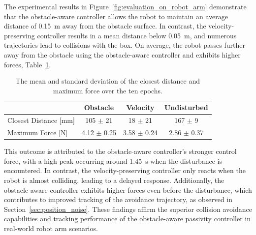 The experimental results in Figure~\ref{fig:evaluation_on_robot_arm} demonstrate that the obstacle-aware controller allows the robot to maintain an average distance of \qty{0.15}{m} away from the obstacle surface. In contrast, the velocity-preserving controller results in a mean distance below \qty{0.05}{m}, and numerous trajectories lead to collisions with the box. On average, the robot passes further away from the obstacle using the obstacle-aware controller and exhibits higher forces, Table~\ref{tab:evaluation_on_robot_arm}.

\begin{table}[htb]
    \centering
    \begin{tabular}{|l|c|c|c|} \hline
        & Obstacle & Velocity & Undisturbed \\ \hline
         Closest Distance [mm] &  105 $\pm$ 21 & 18 $\pm$ 21 & 167 $\pm$ 9 \\ \hline
         Maximum Force [N] & 4.12 $\pm$ 0.25 & 3.58 $\pm$ 0.24 & 2.86 $\pm$ 0.37  \\ \hline 
    \end{tabular}
    \caption{The mean and standard deviation of the closest distance and maximum force over the ten epochs.}
    \label{tab:evaluation_on_robot_arm}
\end{table}

This outcome is attributed to the obstacle-aware controller's stronger control force, with a high peak occurring around \qty{1.45}{s} when the disturbance is encountered. In contrast, the velocity-preserving controller only reacts when the robot is almost colliding, leading to a delayed response. Additionally, the obstacle-aware controller exhibits higher forces even before the disturbance, which contributes to improved tracking of the avoidance trajectory, as observed in Section~\ref{sec:position_noise}. These findings affirm the superior collision avoidance capabilities and tracking performance of the obstacle-aware passivity controller in real-world robot arm scenarios.


